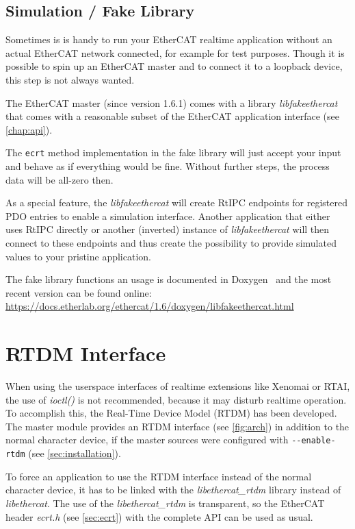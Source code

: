 \documentclass[a4paper,12pt,BCOR=6mm,bibtotoc,idxtotoc]{scrbook}
\begin{document}
\subsection{Simulation / Fake Library}
\label{sec:fakelib}

Sometimes is is handy to run your EtherCAT realtime application without an
actual EtherCAT network connected, for example for test purposes.
Though it is possible to spin up an EtherCAT master and to connect it to a
loopback device, this step is not always wanted.

The EtherCAT master (since version 1.6.1) comes with a library
\textit{libfakeethercat} that comes with a reasonable subset of the EtherCAT
application interface (see \autoref{chap:api}).

The \texttt{ecrt} method implementation in the fake library will just accept
your input and behave as if everything would be fine. Without further steps,
the process data will be all-zero then.

As a special feature, the \textit{libfakeethercat} will create RtIPC
\cite{rtipc} endpoints for registered PDO entries to enable a simulation
interface. Another application that either uses RtIPC directly or another
(inverted) instance of \textit{libfakeethercat} will then connect to these
endpoints and thus create the possibility to provide simulated values to your
pristine application.

The fake library functions an usage is documented in Doxygen~\cite{doxygen}
and the most recent version can be found online:
\url{https://docs.etherlab.org/ethercat/1.6/doxygen/libfakeethercat.html}


\section{RTDM Interface}
\label{sec:rtdm}

When using the userspace interfaces of realtime extensions like Xenomai or
RTAI, the use of \textit{ioctl()} is not recommended, because it may disturb
realtime operation. To accomplish this, the Real-Time Device Model (RTDM)
\cite{rtdm} has been developed.  The master module provides an RTDM interface
(see \autoref{fig:arch}) in addition to the normal character device, if the
master sources were configured with \lstinline+--enable-rtdm+ (see
\autoref{sec:installation}).

To force an application to use the RTDM interface instead of the normal
character device, it has to be linked with the \textit{libethercat\_rtdm}
library instead of \textit{libethercat}. The use of the
\textit{libethercat\_rtdm} is transparent, so the EtherCAT header
\textit{ecrt.h} (see \autoref{sec:ecrt}) with the complete API can be used as
usual.
\end{document}
